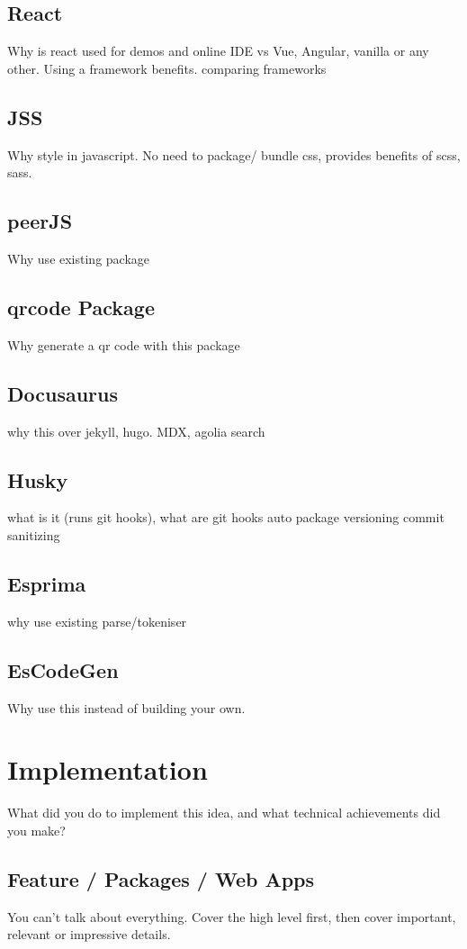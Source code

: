 \documentclass{l4proj}
\begin{document}
\section{React}
\text Why is react used for demos and online IDE vs Vue, Angular, vanilla or any other. Using a framework benefits.
comparing frameworks
\section{JSS}
\text Why style in javascript. No need to package/ bundle css, provides benefits of scss, sass.
\section{peerJS}
\text Why use existing package
\section{qrcode Package}
\text Why generate a qr code with this package
\section{Docusaurus}
\text why this over jekyll, hugo. MDX, agolia search
\section{Husky}
\text what is it (runs git hooks), what are git hooks
auto package versioning
commit sanitizing
\section{Esprima}
\text why use existing parse/tokeniser
\section{EsCodeGen}
\text Why use this instead of building your own.
\chapter{Implementation}
What did you do to implement this idea, and what technical achievements did you make?
\section{Feature / Packages / Web Apps}
You can't talk about everything. Cover the high level first, then cover important, relevant or impressive details.
\end{document}

